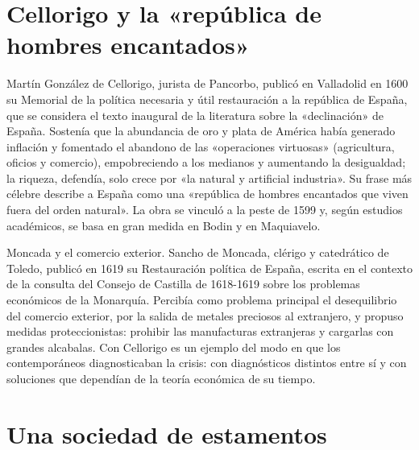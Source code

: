 \documentclass{book}
\begin{document}

\section{Cellorigo y la «república de hombres encantados»}

Martín González de Cellorigo, jurista de Pancorbo, publicó en Valladolid en 1600 su Memorial de la política necesaria y útil restauración a la república de España, que se considera el texto inaugural de la literatura sobre la «declinación» de España. Sostenía que la abundancia de oro y plata de América había generado inflación y fomentado el abandono de las «operaciones virtuosas» (agricultura, oficios y comercio), empobreciendo a los medianos y aumentando la desigualdad; la riqueza, defendía, solo crece por «la natural y artificial industria». Su frase más célebre describe a España como una «república de hombres encantados que viven fuera del orden natural». La obra se vinculó a la peste de 1599 y, según estudios académicos, se basa en gran medida en Bodin y en Maquiavelo.


Moncada y el comercio exterior. Sancho de Moncada, clérigo y catedrático de Toledo, publicó en 1619 su Restauración política de España, escrita en el contexto de la consulta del Consejo de Castilla de 1618-1619 sobre los problemas económicos de la Monarquía. Percibía como problema principal el desequilibrio del comercio exterior, por la salida de metales preciosos al extranjero, y propuso medidas proteccionistas: prohibir las manufacturas extranjeras y cargarlas con grandes alcabalas. Con Cellorigo es un ejemplo del modo en que los contemporáneos diagnosticaban la crisis: con diagnósticos distintos entre sí y con soluciones que dependían de la teoría económica de su tiempo.


\section{Una sociedad de estamentos}
\end{document}
